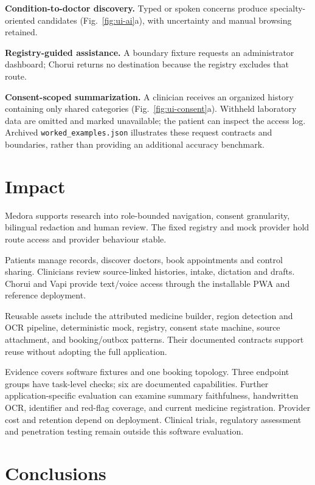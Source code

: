 \documentclass[preprint,12pt,a4paper]{elsarticle}
\begin{document}
\textbf{Condition-to-doctor discovery.} Typed or spoken concerns produce specialty-oriented
candidates (Fig.~\ref{fig:ui-ai}a), with uncertainty and manual browsing retained.

\textbf{Registry-guided assistance.} A boundary fixture requests an administrator
dashboard; Chorui returns no destination because the registry excludes that route.

\textbf{Consent-scoped summarization.} A clinician receives an organized history containing
only shared categories (Fig.~\ref{fig:ui-consent}a). Withheld laboratory data are omitted
and marked unavailable; the patient can inspect the access log. Archived
\texttt{worked\_examples.json} illustrates these request contracts and boundaries,
rather than providing an additional accuracy benchmark.

\section{Impact}

Medora supports research into role-bounded navigation, consent granularity, bilingual
redaction and human review. The fixed registry and mock provider hold route access and
provider behaviour stable.

Patients manage records, discover doctors, book appointments and control sharing.
Clinicians review source-linked histories, intake, dictation and drafts. Chorui and Vapi
provide text/voice access through the installable PWA and reference deployment.

Reusable assets include the attributed medicine builder, region detection and OCR pipeline,
deterministic mock, registry, consent state machine, source attachment, and booking/outbox
patterns. Their documented contracts support reuse without adopting the full application.

Evidence covers software fixtures and one booking topology. Three endpoint groups have
task-level checks; six are documented capabilities. Further application-specific evaluation
can examine summary faithfulness, handwritten OCR, identifier and red-flag coverage,
and current medicine registration. Provider cost and retention depend on deployment.
Clinical trials, regulatory assessment and penetration testing remain outside this
software evaluation.

\section{Conclusions}
\end{document}
